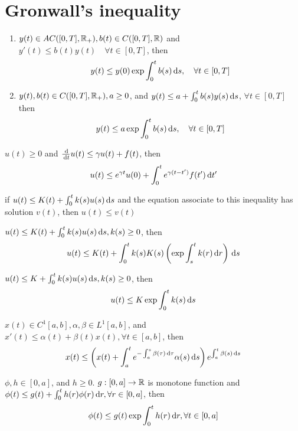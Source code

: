 \documentclass[../main]{subfiles}
\begin{document}
\section{Gronwall's inequality}

\begin{thm}
\begin{enumerate}
    \item $y(t)\in AC([0,T],\mathbb{R}_+),b(t)\in C([0,T],\mathbb{R})$ and $y'(t)\le b(t)y(t) \quad \forall t\in[0,T]$, then\begin{equation}
        y(t)\le y(0)\exp{\int_0^t b(s)\,\mathrm{d}s}, \quad \forall t\in [0,T]
    \end{equation}
    \item $y(t),b(t)\in C([0,T],\mathbb{R}_+), a\ge 0$, and $y(t)\le a +\int_0^t b(s)y(s)\,\mathrm{d}s$, $\forall t\in [0,T]$ then\begin{equation}
        y(t)\le a \exp{\int_0^t b(s)\,\mathrm{d}s}, \quad \forall t\in [0,T]
    \end{equation} 
\end{enumerate}
\end{thm}

\begin{thm}
$u(t)\ge 0$ and $\frac{\D}{\D{t}}u(t)\le \gamma u(t)+f(t)$, then \begin{equation}
    u(t)\le e^{\gamma t} u(0)+\int_0^t e^{\gamma(t-t')}f(t')\,\mathrm{d}t'
\end{equation}
\end{thm}

\begin{lem}
if $u(t)\le K(t)+\int_0^t k(s)u(s)\,\mathrm{d}s$ and the equation associate to this inequality has solution $v(t)$, then $u(t)\le v(t)$ 
\end{lem}

\begin{thm}
$u(t)\le K(t)+\int_0^t k(s)u(s)\,\mathrm{d}s, k(s)\ge 0$, then \begin{equation}
    u(t)\le K(t)+\int_0^t k(s) K(s) \left( \exp \int_s^t k(r)\,\mathrm{d}r \right)\,\mathrm{d}s 
\end{equation}
\end{thm}

\begin{thm}
$u(t)\le K+\int_0^t k(s)u(s)\,\mathrm{d}s, k(s)\ge 0$, then \begin{equation}
    u(t)\le K\exp \int_0^t k(s)\,\mathrm{d}s
\end{equation}
\end{thm}

\begin{thm}
$x(t)\in C^1[a,b], \alpha, \beta \in L^1[a,b]$, and $x'(t)\le \alpha(t)+\beta(t)x(t), \forall t\in [a,b]$, then\begin{equation}
    x(t)\le \left( x(t)+\int_a^t e^{-\int_a^s \beta(\tau)\,\mathrm{d}\tau}\alpha(s)\,\mathrm{d}s  \right)e^{\int_a^t\beta(s)\,\mathrm{d}s}
\end{equation}
\end{thm}

\begin{thm}
$\phi, h \in [0,a]$, and $h\ge 0$. $g:[0,a]\to \mathbb{R}$ is monotone function and $\phi(t)\le g(t)+\int_0^t h(r)\phi(r)\,\mathrm{d}r, \forall r\in [0,a]$, then\begin{equation}
    \phi(t)\le g(t)\exp \int_0^t h(r)\,\mathrm{d}r, \forall t\in [0,a]
\end{equation}
\end{thm}
\end{document}
